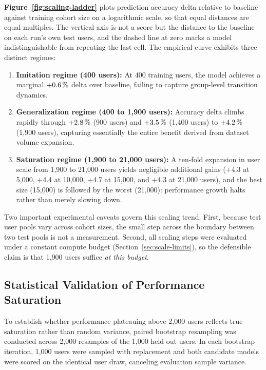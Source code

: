 

\textbf{Figure~\ref{fig:scaling-ladder}} plots prediction accuracy delta relative to baseline against training cohort size on a logarithmic scale, so that equal distances are equal multiples. The vertical axis is not a score but the distance to the baseline on each run's own test users, and the dashed line at zero marks a model indistinguishable from repeating the last cell. The empirical curve exhibits three distinct regimes:
\begin{enumerate}
    \item \textbf{Imitation regime (400 users):} At 400 training users, the model achieves a marginal $+0.6\,\%$ delta over baseline, failing to capture group-level transition dynamics.
    \item \textbf{Generalization regime (400 to 1,900 users):} Accuracy delta climbs rapidly through $+2.8\,\%$ (900 users) and $+3.5\,\%$ (1,400 users) to $+4.2\,\%$ (1,900 users), capturing essentially the entire benefit derived from dataset volume expansion.
    \item \textbf{Saturation regime (1,900 to 21,000 users):} A ten-fold expansion in user scale from 1,900 to 21,000 users yields negligible additional gains (+4.3\pt{} at 5,000, +4.4\pt{} at 10,000, +4.7\pt{} at 15,000, and +4.3\pt{} at 21,000 users), and the best size (15,000) is followed by the worst (21,000): performance growth halts rather than merely slowing down.
\end{enumerate}

Two important experimental caveats govern this scaling trend. First, because test user pools vary across cohort sizes, the small step across the boundary between two test pools is not a measurement. Second, all scaling steps were evaluated under a constant compute budget (Section~\ref{sec:scale-limits}), so the defensible claim is that 1,900 users suffice \emph{at this budget}.

\subsection{Statistical Validation of Performance Saturation}

To establish whether performance plateauing above 2,000 users reflects true saturation rather than random variance, paired bootstrap resampling \textbf{\cite{efron1993bootstrap}} was conducted across 2,000 resamples of the 1,000 held-out users. In each bootstrap iteration, 1,000 users were sampled with replacement and both candidate models were scored on the identical user draw, canceling evaluation sample variance.

